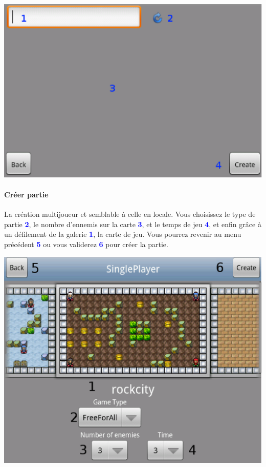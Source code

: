 		
	\begin{center}
		\includegraphics[scale=0.6]{Manuel/Img/19.eps}
	\end{center}
	
	\paragraph{Créer partie}
	La création multijoueur et semblable à celle en locale.
	Vous choisissez le type de partie
	\textcolor{blue}{\textbf{2}}, le nombre
	d'ennemis sur la carte \textcolor{blue}{\textbf{3}}, et le temps de jeu
	\textcolor{blue}{\textbf{4}}, et enfin grâce à un défilement de la galerie
	\textcolor{blue}{\textbf{1}}, la carte de jeu. Vous pourrez revenir au menu
	précédent \textcolor{blue}{\textbf{5}} ou vous validerez
	\textcolor{blue}{\textbf{6}} pour créer la partie.
	
	\begin{center}
		\includegraphics[scale=0.4]{Manuel/Img/16.eps}
	\end{center}
	
